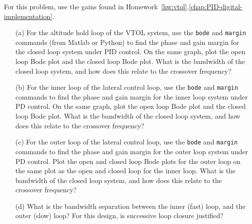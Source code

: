 For this problem, use the gains found in Homework~\ref{hw:vtol}.\ref{chap:PID-digital-implementation}.
\begin{itemize}
\item[(a)] For the altitude hold loop of the VTOL system, use the \texttt{bode} and \texttt{margin} commands (from Matlab or Python) to find the phase and gain margin for the closed loop system under PID control.  On the same graph, plot the open loop Bode plot and the closed loop Bode plot.  What is the bandwidth of the closed loop system, and how does this relate to the crossover frequency?  

\item[(b)]  For the inner loop of the lateral control loop, use the \texttt{bode} and \texttt{margin} commands to find the phase and gain margin for the inner loop system under PD control.  On the same graph, plot the open loop Bode plot and the closed loop Bode plot.  What is the bandwidth of the closed loop system, and how does this relate to the crossover frequency?

\item[(c)]  For the outer loop of the lateral control loop, use the \texttt{bode} and \texttt{margin} commands to find the phase and gain margin for the outer loop system under PD control.  Plot the open and closed loop Bode plots for the outer loop on the same plot as the open and closed loop for the inner loop.  What is the bandwidth of the closed loop system, and how does this relate to the crossover frequency?

\item[(d)]  What is the bandwidth separation between the inner (fast) loop, and the outer (slow) loop?  For this design, is successive loop closure justified?
\end{itemize}
